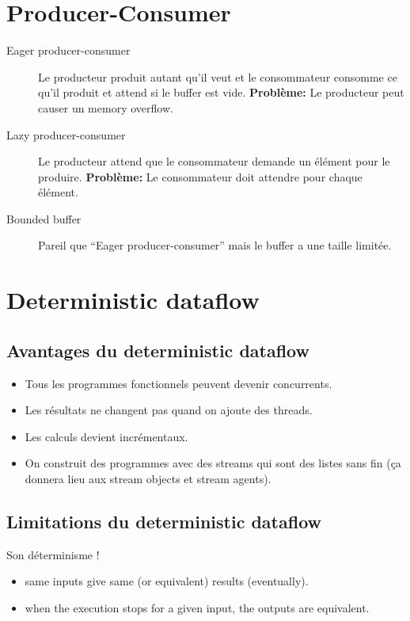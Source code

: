 \section{Producer-Consumer}
\begin{description}
  \item[Eager producer-consumer]
    Le producteur produit autant qu'il veut et le consommateur consomme ce qu'il produit et attend si le buffer est vide.
    \textbf{Problème:} Le producteur peut causer un memory overflow.
  \item[Lazy producer-consumer]
    Le producteur attend que le consommateur demande un élément pour le produire.
    \textbf{Problème:} Le consommateur doit attendre pour chaque élément.
  \item[Bounded buffer]
    Pareil que ``Eager producer-consumer'' mais le buffer a une taille limitée.
\end{description}

\section{Deterministic dataflow}
\subsection{Avantages du deterministic dataflow} %
\begin{itemize}
  \item Tous les programmes fonctionnels peuvent devenir concurrents.
  \item Les résultats ne changent pas quand on ajoute des threads.
  \item Les calculs devient incrémentaux.
  \item On construit des programmes avec des streams qui sont
    des listes sans fin (ça donnera lieu aux stream objects et stream agents).
\end{itemize}

\subsection{Limitations du deterministic dataflow}
Son déterminisme !
\begin{itemize}
  \item same inputs give same (or equivalent) results (eventually).
  \item when the execution stops for a given input, the outputs are equivalent.
\end{itemize}

